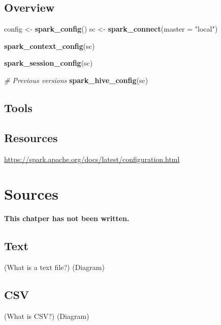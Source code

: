 \documentclass[]{book}
\newenvironment{Shaded}{\begin{snugshade}}{\end{snugshade}}
\newcommand{\CommentTok}[1]{\textcolor[rgb]{0.56,0.35,0.01}{\textit{#1}}}
\newcommand{\DataTypeTok}[1]{\textcolor[rgb]{0.13,0.29,0.53}{#1}}
\newcommand{\KeywordTok}[1]{\textcolor[rgb]{0.13,0.29,0.53}{\textbf{#1}}}
\newcommand{\NormalTok}[1]{#1}
\newcommand{\StringTok}[1]{\textcolor[rgb]{0.31,0.60,0.02}{#1}}
\theoremstyle{definition}
\theoremstyle{definition}
\theoremstyle{definition}
\theoremstyle{remark}
\begin{document}
\hypertarget{overview-3}{%
\section{Overview}\label{overview-3}}

\begin{Shaded}
\begin{Highlighting}[]
\NormalTok{config <-}\StringTok{ }\KeywordTok{spark_config}\NormalTok{()}
\NormalTok{sc <-}\StringTok{ }\KeywordTok{spark_connect}\NormalTok{(}\DataTypeTok{master =} \StringTok{"local"}\NormalTok{)}

\KeywordTok{spark_context_config}\NormalTok{(sc)}

\KeywordTok{spark_session_config}\NormalTok{(sc)}

\CommentTok{# Previous versions}
\KeywordTok{spark_hive_config}\NormalTok{(sc)}
\end{Highlighting}
\end{Shaded}

\hypertarget{tools-1}{%
\section{Tools}\label{tools-1}}

\hypertarget{resources}{%
\section{Resources}\label{resources}}

\url{https://spark.apache.org/docs/latest/configuration.html}

\hypertarget{sources}{%
\chapter{Sources}\label{sources}}

\textbf{This chatper has not been written.}

\hypertarget{text}{%
\section{Text}\label{text}}

(What is a text file?) (Diagram)

\hypertarget{csv}{%
\section{CSV}\label{csv}}

(What is CSV?) (Diagram)
\end{document}
